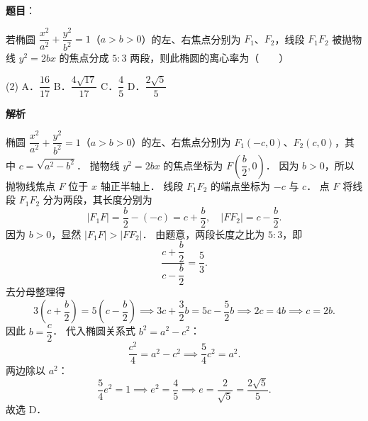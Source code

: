 \begin{answer}

\textbf{题目}：

若椭圆 $\dfrac{x^2}{a^2} + \dfrac{y^2}{b^2} = 1$（$a > b > 0$）的左、右焦点分别为 $F_1$、$F_2$，线段 $F_1 F_2$ 被抛物线 $y^2 = 2bx$ 的焦点分成 $5 : 3$ 两段，则此椭圆的离心率为\mbox{（　　）}

\begin{gkopts}(2)
\task A．$\dfrac{16}{17}$
\task B．$\dfrac{4\sqrt{17}}{17}$
\task C．$\dfrac{4}{5}$
\task D．$\dfrac{2\sqrt{5}}{5}$
\end{gkopts}

\textbf{解析}

椭圆 $\dfrac{x^2}{a^2} + \dfrac{y^2}{b^2} = 1$（$a > b > 0$）的左、右焦点分别为 $F_1(-c, 0)$、$F_2(c, 0)$，其中 $c = \sqrt{a^2 - b^2}$．
抛物线 $y^2 = 2bx$ 的焦点坐标为 $F\left(\dfrac{b}{2}, 0\right)$．
因为 $b > 0$，所以抛物线焦点 $F$ 位于 $x$ 轴正半轴上．
线段 $F_1 F_2$ 的端点坐标为 $-c$ 与 $c$．
点 $F$ 将线段 $F_1 F_2$ 分为两段，其长度分别为
\nopagebreak[4]
\[
|F_1 F| = \frac{b}{2} - (-c) = c + \frac{b}{2}, \quad |F F_2| = c - \frac{b}{2}.
\]
因为 $b > 0$，显然 $|F_1 F| > |F F_2|$．
由题意，两段长度之比为 $5 : 3$，即
\nopagebreak[4]
\[
\frac{c + \dfrac{b}{2}}{c - \dfrac{b}{2}} = \frac{5}{3}.
\]
去分母整理得
\nopagebreak[4]
\[
3\left(c + \frac{b}{2}\right) = 5\left(c - \frac{b}{2}\right) \implies 3c + \frac{3}{2}b = 5c - \frac{5}{2}b \implies 2c = 4b \implies c = 2b.
\]
因此 $b = \dfrac{c}{2}$．
代入椭圆关系式 $b^2 = a^2 - c^2$：
\nopagebreak[4]
\[
\frac{c^2}{4} = a^2 - c^2 \implies \frac{5}{4}c^2 = a^2.
\]
两边除以 $a^2$：
\nopagebreak[4]
\[
\frac{5}{4}e^2 = 1 \implies e^2 = \frac{4}{5} \implies e = \frac{2}{\sqrt{5}} = \frac{2\sqrt{5}}{5}.
\]
故选 D．


\end{answer}
